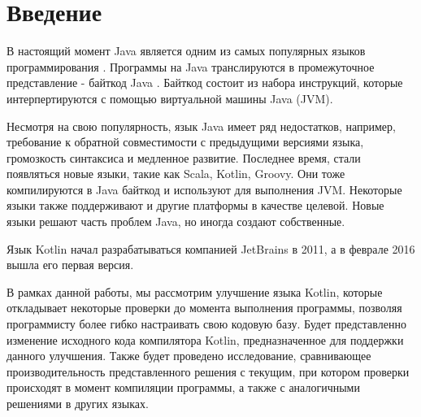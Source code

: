 \section*{Введение}

В настоящий момент Java является одним из самых популярных языков программирования \cite{online:TIOBELanguageIndex}. Программы на Java транслируются в промежуточное представление - байткод Java \cite{book:yellin1996java}. Байткод состоит из набора инструкций, которые интерпертируются с помощью виртуальной машины Java (JVM).

Несмотря на свою популярность, язык Java имеет ряд недостатков, например, требование к обратной совместимости с предыдущими версиями языка, громозкость синтаксиса и медленное развитие. Последнее время, стали появляться новые языки, такие как Scala, Kotlin, Groovy. Они тоже компилируются в Java байткод и используют для выполнения JVM. Некоторые языки также поддерживают и другие платформы в качестве целевой. Новые языки решают часть проблем Java, но иногда создают собственные.

Язык Kotlin начал разрабатываться компанией JetBrains в 2011, а в феврале 2016 вышла его первая версия.

В рамках данной работы, мы рассмотрим улучшение языка Kotlin, которые откладывает некоторые проверки до момента выполнения программы, позволяя программисту более гибко настраивать свою кодовую базу. Будет представленно изменение исходного кода компилятора Kotlin, предназначенное для поддержки данного улучшения. Также будет проведено исследование, сравнивающее производительность представленного решения с текущим, при котором проверки происходят в момент компиляции  программы, а также с аналогичными решениями в других языках.
